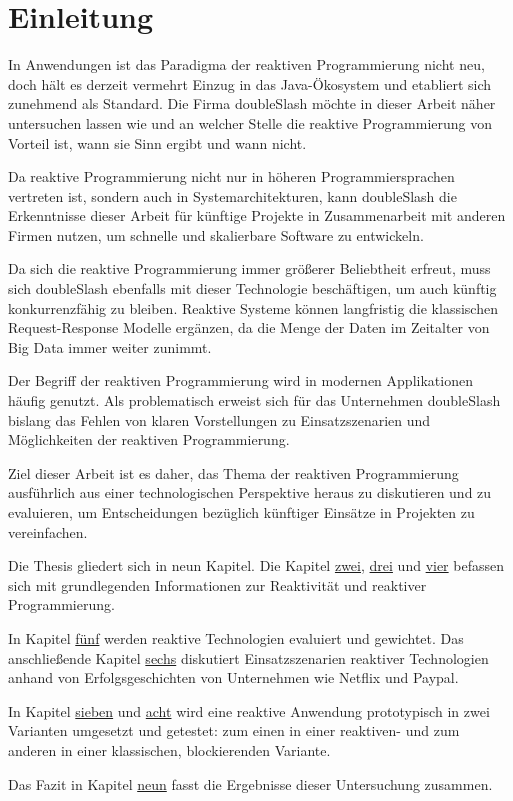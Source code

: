 \chapter{Einleitung} 
In Anwendungen ist das Paradigma der reaktiven Programmierung nicht neu, doch hält es derzeit vermehrt Einzug in das Java-Ökosystem und etabliert sich zunehmend als Standard. Die Firma doubleSlash möchte in dieser Arbeit näher untersuchen lassen wie und an welcher Stelle die reaktive Programmierung von Vorteil ist, wann sie Sinn ergibt und wann nicht.

Da reaktive Programmierung nicht nur in höheren Programmiersprachen vertreten ist, sondern auch in Systemarchitekturen, kann doubleSlash die Erkenntnisse dieser Arbeit für künftige Projekte in Zusammenarbeit mit anderen Firmen nutzen, um schnelle und skalierbare Software zu entwickeln.

Da sich die reaktive Programmierung immer größerer Beliebtheit erfreut, muss sich doubleSlash ebenfalls mit dieser Technologie beschäftigen, um auch künftig konkurrenzfähig zu bleiben. Reaktive Systeme können langfristig die klassischen Request-Response Modelle ergänzen, da die Menge der Daten im Zeitalter von Big Data immer weiter zunimmt. 

Der Begriff der reaktiven Programmierung wird in modernen Applikationen häufig genutzt. Als problematisch erweist sich für das Unternehmen doubleSlash bislang das Fehlen von klaren Vorstellungen zu Einsatzszenarien und Möglichkeiten der reaktiven Programmierung.

Ziel dieser Arbeit ist es daher, das Thema der reaktiven Programmierung ausführlich aus einer technologischen Perspektive heraus zu diskutieren und zu evaluieren, um Entscheidungen bezüglich künftiger Einsätze in Projekten zu vereinfachen.

Die Thesis gliedert sich in neun Kapitel. Die Kapitel \hyperref[chap:reaktivitaet_in_software]{zwei}, \hyperref[chap:reaktivitaet_auf_der_systemebene]{drei} und \hyperref[chap:reaktivitaet_auf_der_anwendungsebene]{vier} befassen sich mit grundlegenden Informationen zur Reaktivität und reaktiver Programmierung.

In Kapitel \hyperref[chap:evaluierung]{fünf} werden reaktive Technologien evaluiert und gewichtet. Das anschließende Kapitel \hyperref[chap:scenario]{sechs} diskutiert Einsatzszenarien reaktiver Technologien anhand von Erfolgsgeschichten von Unternehmen wie Netflix und Paypal.

In Kapitel \hyperref[chap:concept]{sieben} und \hyperref[chap:umsetzung]{acht} wird eine reaktive Anwendung prototypisch in zwei Varianten umgesetzt und getestet: zum einen in einer reaktiven- und zum anderen in einer klassischen, blockierenden Variante.

Das Fazit in Kapitel \hyperref[chap:fazit]{neun} fasst die Ergebnisse dieser Untersuchung zusammen.